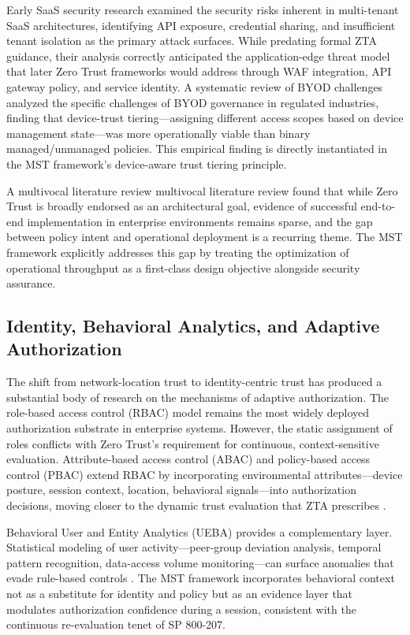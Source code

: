 \documentclass[acmlarge]{acmart}
\begin{document}
Early SaaS security research \cite{dechaves2011} examined the security risks inherent in multi-tenant
SaaS architectures, identifying API exposure, credential sharing, and insufficient
tenant isolation as the primary attack surfaces. While predating formal ZTA guidance, their
analysis correctly anticipated the application-edge threat model that later Zero Trust
frameworks would address through WAF integration, API gateway policy, and service identity.
A systematic review of BYOD challenges \cite{balasubramanian2021} analyzed the specific challenges of BYOD
governance in regulated industries, finding that device-trust tiering---assigning different
access scopes based on device management state---was more operationally viable than binary
managed/unmanaged policies. This empirical finding is directly instantiated in the MST
framework's device-aware trust tiering principle.

A multivocal literature review \cite{buck2021} multivocal literature review found that while Zero Trust is
broadly endorsed as an architectural goal, evidence of successful end-to-end implementation
in enterprise environments remains sparse, and the gap between policy intent and
operational deployment is a recurring theme. The MST framework explicitly addresses this
gap by treating the optimization of operational throughput as a first-class design objective
alongside security assurance.

\subsection{Identity, Behavioral Analytics, and Adaptive Authorization}

The shift from network-location trust to identity-centric trust has produced a substantial
body of research on the mechanisms of adaptive authorization. The role-based access control (RBAC) model \cite{sandhu1994} remains the most widely deployed
authorization substrate in enterprise systems. However, the static assignment of roles
conflicts with Zero Trust's requirement for continuous, context-sensitive evaluation.
Attribute-based access control (ABAC) and policy-based access control (PBAC) extend RBAC
by incorporating environmental attributes---device posture, session context, location,
behavioral signals---into authorization decisions, moving closer to the dynamic trust
evaluation that ZTA prescribes \cite{hu2014}.

Behavioral User and Entity Analytics (UEBA) provides a complementary layer. Statistical
modeling of user activity---peer-group deviation analysis, temporal pattern recognition,
data-access volume monitoring---can surface anomalies that evade rule-based controls
\cite{tuor2017}. The MST framework incorporates behavioral context not as a substitute
for identity and policy but as an evidence layer that modulates authorization confidence
during a session, consistent with the continuous re-evaluation tenet of SP 800-207.
\end{document}
